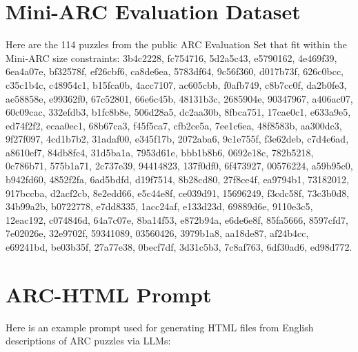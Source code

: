 \documentclass[10pt,twocolumn]{article}
\begin{document}



\appendix

\section{Mini-ARC Evaluation Dataset}
\label{app:evaluation-dataset}

Here are the 114 puzzles from the public ARC Evaluation Set that fit
within the Mini-ARC size constraints: 3b4c2228, fc754716, 5d2a5c43,
e5790162, 4e469f39, 6ea4a07e, bf32578f, ef26cbf6, ca8de6ea, 5783df64,
9c56f360, d017b73f, 626c0bcc, c35c1b4c, c48954c1, b15fca0b, 4acc7107,
ac605cbb, f0afb749, c8b7cc0f, da2b0fe3, ae58858e, e99362f0, 67c52801,
66e6c45b, 48131b3c, 2685904e, 90347967, a406ac07, 60c09cac, 332efdb3,
b1fc8b8e, 506d28a5, dc2aa30b, 8fbca751, 17cae0c1, e633a9e5, ed74f2f2,
ecaa0ec1, 68b67ca3, f45f5ca7, cfb2ce5a, 7ee1c6ea, 48f8583b, aa300dc3,
9f27f097, 4cd1b7b2, 31adaf00, e345f17b, 2072aba6, 9c1e755f, f3e62deb,
c7d4e6ad, a8610ef7, 84db8fc4, 31d5ba1a, 7953d61e, bbb1b8b6, 0692e18c,
782b5218, 0c786b71, 575b1a71, 2c737e39, 94414823, 137f0df0, 6f473927,
00576224, a59b95c0, b942fd60, 4852f2fa, 6ad5bdfd, d19f7514, 8b28cd80,
27f8ce4f, ea9794b1, 73182012, 917bccba, d2acf2cb, 8e2edd66, e5c44e8f,
ce039d91, 15696249, f3cdc58f, 73c3b0d8, 34b99a2b, b0722778, e7dd8335,
1acc24af, e133d23d, 69889d6e, 9110e3c5, 12eac192, c074846d, 64a7c07e,
8ba14f53, e872b94a, e6de6e8f, 85fa5666, 8597cfd7, 7e02026e, 32e9702f,
59341089, 03560426, 3979b1a8, aa18de87, af24b4cc, e69241bd, be03b35f,
27a77e38, 0becf7df, 3d31c5b3, 7c8af763, 6df30ad6, ed98d772.

\section{ARC-HTML Prompt}
Here is an example prompt used for generating HTML files from English
descriptions of ARC puzzles via LLMs:
\end{document}
